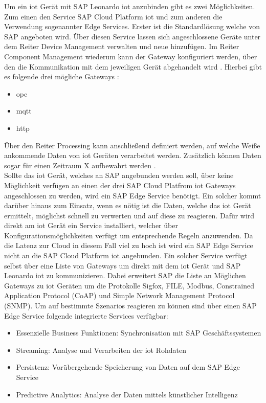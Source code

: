 \noindent Um ein \ac{iot} Gerät mit SAP Leonardo \ac{iot} anzubinden gibt es zwei Möglichkeiten. Zum einen den Service SAP Cloud Platform \ac{iot} und zum anderen die Verwendung sogenannter Edge Services. Erster ist die Standardlösung welche von SAP angeboten wird. Über diesen Service lassen sich angeschlossene Geräte unter dem Reiter Device Management verwalten und neue hinzufügen. Im Reiter Component Management wiederum kann der Gateway konfiguriert werden, über den die Kommunikation mit dem jeweiligen Gerät abgehandelt wird \cite[Seite 200f]{Holtschulte20:IOS}. Hierbei gibt es folgende drei mögliche Gateways \cite[Seite 117]{Holtschulte20:IOS}:
\begin{itemize}
	\item{\ac{opc}}
	\item{\ac{mqtt}}
	\item{\ac{http}}
\end{itemize}
Über den Reiter Processing kann anschließend definiert werden, auf welche Weiße ankommende Daten von \ac{iot} Geräten verarbeitet werden. Zusätzlich können Daten sogar für einen Zeitraum X aufbewahrt werden \cite[Seite 205]{Holtschulte20:IOS}.\\

\noindent Sollte das \ac{iot} Gerät, welches an SAP angebunden werden soll, über keine Möglichkeit verfügen an einen der drei SAP Cloud Platfrom \ac{iot} Gateways angeschlossen zu werden, wird ein SAP Edge Service benötigt. Ein solcher kommt darüber hinaus zum Einsatz, wenn es nötig ist die Daten, welche das \ac{iot} Gerät ermittelt, möglichst schnell zu verwerten und auf diese zu reagieren. Dafür wird direkt am \ac{iot} Gerät ein Service installiert, welcher über Konfigurationsmöglichkeiten verfügt um entsprechende Regeln anzuwenden. Da die Latenz zur Cloud in diesem Fall viel zu hoch ist wird ein SAP Edge Service nicht an die SAP Cloud Platform \ac{iot} angebunden. Ein solcher Service verfügt selbst über eine Liste von Gateways um direkt mit dem \ac{iot} Gerät und SAP Leonardo \ac{iot} zu kommunizieren. Dabei erweitert SAP die Liste an Möglichen Gateways zu \ac{iot} Geräten um die Protokolle Sigfox, FILE, Modbus, Constrained Application Protocol (CoAP) und Simple Network Management Protocol (SNMP). Um auf bestimmte Szenarios reagieren zu können sind über einen SAP Edge Service folgende integrierte Services verfügbar\cite[Seite 229ff]{Holtschulte20:IOS}:
\begin{itemize}
	\item{Essenzielle Business Funktionen: Synchronisation mit SAP Geschäftssystemen}
	\item{Streaming: Analyse und Verarbeiten der \ac{iot} Rohdaten}
	\item{Persistenz: Vorübergehende Speicherung von Daten auf dem SAP Edge Service}
	\item{Predictive Analytics: Analyse der Daten mittels künstlicher Intelligenz}
\end{itemize}   


